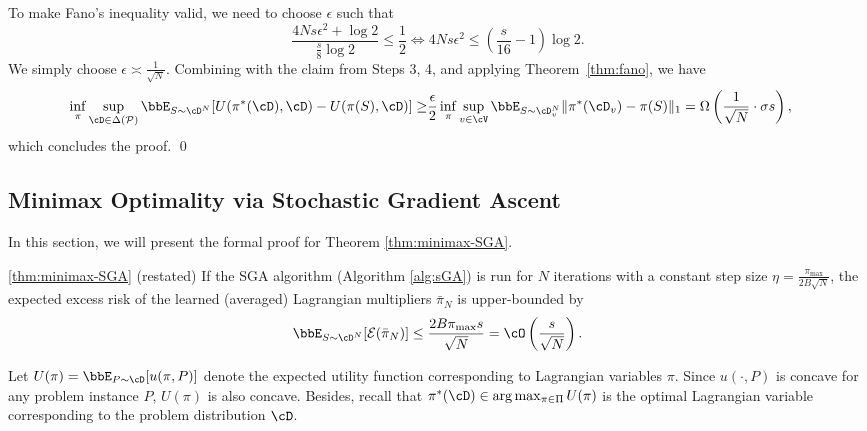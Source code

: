     To make Fano's inequality valid, we need to choose $\epsilon$ such that
    \[
        \frac{4Ns \epsilon^2 + \log 2}{\frac{s}{8}\log 2} \leq \frac{1}{2} \Leftrightarrow 4Ns\epsilon^2 \leq (\frac{s}{16} - 1)\log 2.
    \]
    We simply choose $\epsilon \asymp \frac{1}{\sqrt{N}}$. Combining with the claim from Steps 3, 4, and applying Theorem~\ref{thm:fano}, we have
    \begin{equation*}
        \begin{aligned}
            \inf_{\pi}\sup_{\cD \in \Delta(\mathcal{P})} \bbE_{S \sim \cD^N}[U(\pi^*(\cD), \cD) - U(\pi(S), \cD)]
            \geq &\frac{\epsilon}{2}\inf_{\pi} \sup_{v \in \cV} \bbE_{S \sim \cD_v^N}\|\pi^*(\cD_v) - \pi(S)\|_1 = \Omega \left(\frac{1}{\sqrt{N}} \cdot \sigma s\right),
        \end{aligned}
    \end{equation*}
    which concludes the proof.
\qed

\subsection{Minimax Optimality via Stochastic Gradient Ascent} \label{apx:SGA}
In this section, we will present the formal proof for Theorem \ref{thm:minimax-SGA}.

\begin{customthm}{\ref{thm:minimax-SGA} (restated)}
    If the SGA algorithm (Algorithm \ref{alg:sGA}) is run for $N$ iterations with a constant step size $\eta = \frac{\pi_{\max}}{2B\sqrt{N}}$, the expected excess risk of the learned (averaged) Lagrangian multipliers $\bar{\pi}_N$ is upper-bounded by
    \[
        \bbE_{S \sim \cD^N}[\mathcal{E}(\bar{\pi}_N)] \leq \frac{2B\pi_{\max} s}{\sqrt{N}} = \cO\left(\frac{s}{\sqrt{N}}\right).
    \]
\end{customthm}
    Let $U(\pi) = \bbE_{P \sim \cD}[u(\pi, P)]$ denote the expected utility function corresponding to Lagrangian variables $\pi$. Since $u(\cdot, P)$ is concave for any problem instance $P$, $U(\pi)$ is also concave. Besides, recall that $\pi^*(\cD) \in \arg \max_{\pi \in \Pi} U(\pi)$ is the optimal Lagrangian variable  corresponding to the problem distribution $\cD$.

